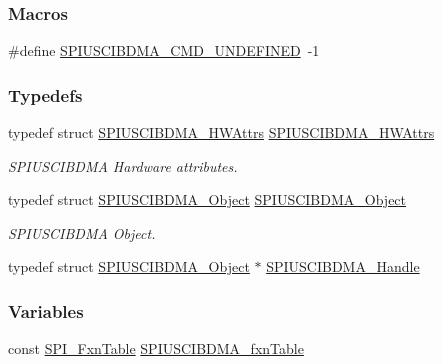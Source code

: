 \subsubsection*{Macros}
\begin{DoxyCompactItemize}
\item 
\#define \hyperlink{_s_p_i_u_s_c_i_b_d_m_a_8h_ac015013945f31d0f7b8992c57a28aa8e}{S\-P\-I\-U\-S\-C\-I\-B\-D\-M\-A\-\_\-\-C\-M\-D\-\_\-\-U\-N\-D\-E\-F\-I\-N\-E\-D}~-\/1
\end{DoxyCompactItemize}
\subsubsection*{Typedefs}
\begin{DoxyCompactItemize}
\item 
typedef struct \hyperlink{struct_s_p_i_u_s_c_i_b_d_m_a___h_w_attrs}{S\-P\-I\-U\-S\-C\-I\-B\-D\-M\-A\-\_\-\-H\-W\-Attrs} \hyperlink{_s_p_i_u_s_c_i_b_d_m_a_8h_aead599faafac7ef553d430f31c144057}{S\-P\-I\-U\-S\-C\-I\-B\-D\-M\-A\-\_\-\-H\-W\-Attrs}
\begin{DoxyCompactList}\small\item\em S\-P\-I\-U\-S\-C\-I\-B\-D\-M\-A Hardware attributes. \end{DoxyCompactList}\item 
typedef struct \hyperlink{struct_s_p_i_u_s_c_i_b_d_m_a___object}{S\-P\-I\-U\-S\-C\-I\-B\-D\-M\-A\-\_\-\-Object} \hyperlink{_s_p_i_u_s_c_i_b_d_m_a_8h_a0698c405d1ebd4309591999417fce4de}{S\-P\-I\-U\-S\-C\-I\-B\-D\-M\-A\-\_\-\-Object}
\begin{DoxyCompactList}\small\item\em S\-P\-I\-U\-S\-C\-I\-B\-D\-M\-A Object. \end{DoxyCompactList}\item 
typedef struct \hyperlink{struct_s_p_i_u_s_c_i_b_d_m_a___object}{S\-P\-I\-U\-S\-C\-I\-B\-D\-M\-A\-\_\-\-Object} $\ast$ \hyperlink{_s_p_i_u_s_c_i_b_d_m_a_8h_afaf74400e5a3e7620329e3a03d072411}{S\-P\-I\-U\-S\-C\-I\-B\-D\-M\-A\-\_\-\-Handle}
\end{DoxyCompactItemize}
\subsubsection*{Variables}
\begin{DoxyCompactItemize}
\item 
const \hyperlink{struct_s_p_i___fxn_table}{S\-P\-I\-\_\-\-Fxn\-Table} \hyperlink{_s_p_i_u_s_c_i_b_d_m_a_8h_ae7f768c12a88c2ad6e03948ae7dde7fa}{S\-P\-I\-U\-S\-C\-I\-B\-D\-M\-A\-\_\-fxn\-Table}
\end{DoxyCompactItemize}


